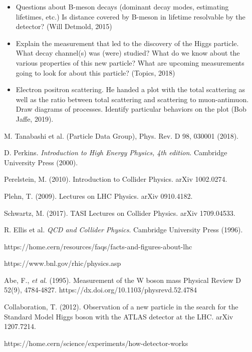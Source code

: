 \documentclass[11pt, oneside]{article}   	%
\theoremstyle{definition}
\numberwithin{equation}{subsection}		%
\begin{document}
\begin{itemize}
	\item Questions about B-meson decays (dominant decay modes, estimating lifetimes, etc.) Is distance covered by B-meson in lifetime 
	resolvable by the detector? (Will Detmold, 2015)
	
	\item Explain the measurement that led to the discovery of the Higgs particle. What decay channel(s) was (were) studied? What do we 
	know about the various properties of this new particle? What are upcoming measurements going to look for about this particle? (Topics, 
	2018)
	
	\item  Electron positron scattering. He handed a plot with the total scattering as well as the ratio between total scattering and scattering 
	to muon-antimuon. Draw diagrams of processes. Identify particular behaviors on the plot (Bob Jaffe, 2019).
	
\end{itemize}

\newpage
\begin{thebibliography}{99}

M. Tanabashi et al. (Particle Data Group), Phys. Rev. D 98, 030001 (2018).

D. Perkins. \textit{Introduction to High Energy Physics, 4th edition}. Cambridge University Press (2000).

Perelstein, M. (2010). Introduction to Collider Physics. arXiv 1002.0274.

Plehn, T. (2009). Lectures on LHC Physics. arXiv 0910.4182.

Schwartz, M. (2017). TASI Lectures on Collider Physics. arXiv 1709.04533.

R. Ellis et al. \textit{QCD and Collider Physics}. Cambridge University Press (1996).

https://home.cern/resources/faqs/facts-and-figures-about-lhc

https://www.bnl.gov/rhic/physics.asp

Abe, F., \textit{et al}. (1995). Measurement of the W boson mass Physical Review D  52(9), 4784-4827. https://dx.doi.org/10.1103/physrevd.52.4784

Collaboration, T. (2012). Observation of a new particle in the search for the Standard Model Higgs boson with the ATLAS detector at the LHC. arXiv 1207.7214.

https://home.cern/science/experiments/how-detector-works

\end{thebibliography}
\end{document}
